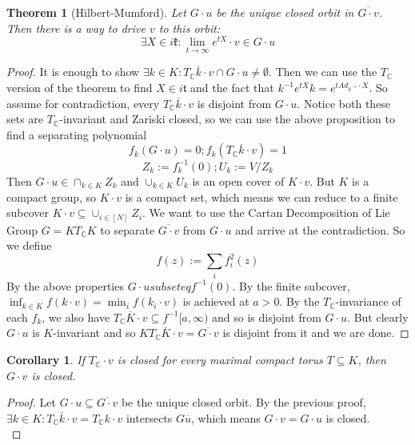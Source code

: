\documentclass{article}
\newtheorem{theorem}{Theorem}
\newtheorem{corollary}{Corollary}
\newcommand{\C}{{\mathbb{C}}}
\begin{document}
\begin{theorem} [Hilbert-Mumford]
Let $G \cdot u$ be the unique closed orbit in $\overline{G \cdot v}$. Then there is a way to drive $v$ to this orbit: 
\[ \exists X \in i \mathfrak{k}: \lim_{t \to \infty} e^{tX} \cdot v \in G \cdot u  \]
\end{theorem}
\begin{proof}
It is enough to show $\exists k \in K: \overline{T_{\C} k \cdot v} \cap G \cdot u \neq \emptyset$. Then we can use the $T_{\C}$ version of the theorem to find $X \in i \mathfrak{t}$ and the fact that $k^{-1} e^{tX} k = e^{t Ad_{k^{-1}} \cdot X}$. So assume for contradiction, every $\overline{T_{\C} k \cdot v}$ is disjoint from $G \cdot u$. Notice both these sets are $T_{\C}$-invariant and Zariski closed, so we can use the above proposition to find a separating polynomial 
\[ f_{k}(G \cdot u) = 0; f_{k}(\overline{T_{\C} k \cdot v}) = 1 \]
\[ Z_{k} := f_{k}^{-1}(0); U_{k} := V/Z_{k} \]
Then $G \cdot u \in \cap_{k \in K} Z_{k}$ and $\cup_{k \in K} U_{k}$ is an open cover of $K \cdot v$. But $K$ is a compact group, so $K \cdot v$ is a compact set, which means we can reduce to a finite subcover $K \cdot v \subseteq \cup_{i \in [N]} Z_{i}$. We want to use the Cartan Decomposition of Lie Group $G = K T_{\C} K$ to separate $\overline{G \cdot v}$ from $G \cdot u$ and arrive at the contradiction. So we define
\[ f(z) := \sum_{i} f_{i}^{2}(z) \]
By the above properties $G \cdot u subseteq f^{-1}(0)$. By the finite subcover, $\inf_{k \in K} f(k \cdot v) = \min_{i} f(k_{i} \cdot v)$ is achieved at $a > 0$. By the $T_{\C}$-invariance of each $f_{k}$, we also have $\overline{T_{\C} K \cdot v} \subseteq f^{-1}[a, \infty)$ and so is disjoint from $G \cdot u$. But clearly $G \cdot u$ is $K$-invariant and so $K\overline{T_{\C} K \cdot v} = \overline{G \cdot v}$ is disjoint from it and we are done. 
\end{proof}

\begin{corollary}
If $T_{\C} \cdot v$ is closed for every maximal compact torus $T \subseteq K$, then $G \cdot v$ is closed. 
\end{corollary}
\begin{proof}
Let $G \cdot u \subseteq \overline{G \cdot v}$ be the unique closed orbit. By the previous proof, $\exists k \in K: \overline{T_{\C} k \cdot v} = T_{\C} k \cdot v$ intersects $G \overline u$, which means $G \cdot v = G \cdot u$ is closed. 
\\ 
\end{proof}
\end{document}
